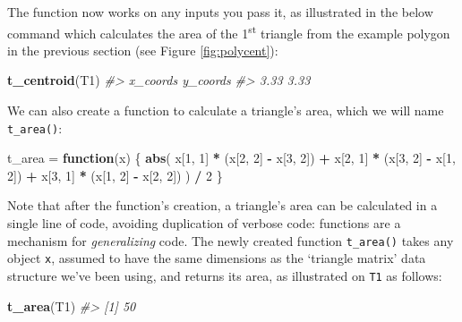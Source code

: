 \documentclass[]{krantz}
\newenvironment{Shaded}{\begin{snugshade}}{\end{snugshade}}
\newcommand{\CommentTok}[1]{\textcolor[rgb]{0.37,0.37,0.37}{\textit{#1}}}
\newcommand{\ControlFlowTok}[1]{\textcolor[rgb]{0.27,0.27,0.27}{\textbf{#1}}}
\newcommand{\DecValTok}[1]{\textcolor[rgb]{0.06,0.06,0.06}{#1}}
\newcommand{\KeywordTok}[1]{\textcolor[rgb]{0.27,0.27,0.27}{\textbf{#1}}}
\newcommand{\NormalTok}[1]{#1}
\newcommand{\OperatorTok}[1]{\textcolor[rgb]{0.43,0.43,0.43}{\textbf{#1}}}
\newcommand{\StringTok}[1]{\textcolor[rgb]{0.5,0.5,0.5}{#1}}
\begin{document}
The function now works on any inputs you pass it, as illustrated in the below command which calculates the area of the 1\textsuperscript{st} triangle from the example polygon in the previous section (see Figure \ref{fig:polycent}):

\begin{Shaded}
\begin{Highlighting}[]
\KeywordTok{t_centroid}\NormalTok{(T1)}
\CommentTok{#> x_coords y_coords }
\CommentTok{#>     3.33     3.33}
\end{Highlighting}
\end{Shaded}

We can also create a function to calculate a triangle's area, which we will name \texttt{t\_area()}:

\begin{Shaded}
\begin{Highlighting}[]
\NormalTok{t_area =}\StringTok{ }\ControlFlowTok{function}\NormalTok{(x) \{}
  \KeywordTok{abs}\NormalTok{(}
\NormalTok{    x[}\DecValTok{1}\NormalTok{, }\DecValTok{1}\NormalTok{] }\OperatorTok{*}\StringTok{ }\NormalTok{(x[}\DecValTok{2}\NormalTok{, }\DecValTok{2}\NormalTok{] }\OperatorTok{-}\StringTok{ }\NormalTok{x[}\DecValTok{3}\NormalTok{, }\DecValTok{2}\NormalTok{]) }\OperatorTok{+}
\StringTok{    }\NormalTok{x[}\DecValTok{2}\NormalTok{, }\DecValTok{1}\NormalTok{] }\OperatorTok{*}\StringTok{ }\NormalTok{(x[}\DecValTok{3}\NormalTok{, }\DecValTok{2}\NormalTok{] }\OperatorTok{-}\StringTok{ }\NormalTok{x[}\DecValTok{1}\NormalTok{, }\DecValTok{2}\NormalTok{]) }\OperatorTok{+}
\StringTok{    }\NormalTok{x[}\DecValTok{3}\NormalTok{, }\DecValTok{1}\NormalTok{] }\OperatorTok{*}\StringTok{ }\NormalTok{(x[}\DecValTok{1}\NormalTok{, }\DecValTok{2}\NormalTok{] }\OperatorTok{-}\StringTok{ }\NormalTok{x[}\DecValTok{2}\NormalTok{, }\DecValTok{2}\NormalTok{])}
\NormalTok{  ) }\OperatorTok{/}\StringTok{ }\DecValTok{2}
\NormalTok{\}}
\end{Highlighting}
\end{Shaded}

Note that after the function's creation, a triangle's area can be calculated in a single line of code, avoiding duplication of verbose code:
functions are a mechanism for \emph{generalizing} code.
The newly created function \texttt{t\_area()} takes any object \texttt{x}, assumed to have the same dimensions as the `triangle matrix' data structure we've been using, and returns its area, as illustrated on \texttt{T1} as follows:

\begin{Shaded}
\begin{Highlighting}[]
\KeywordTok{t_area}\NormalTok{(T1)}
\CommentTok{#> [1] 50}
\end{Highlighting}
\end{Shaded}
\end{document}
